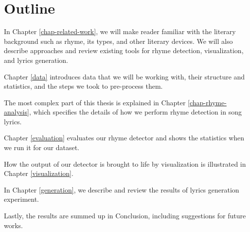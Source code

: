 \section*{Outline}
In Chapter \ref{chap-related-work}, we will make  reader familiar with the literary background such as rhyme, its types, and other literary devices. We will also describe approaches and review existing tools for rhyme detection, visualization, and lyrics generation. 

Chapter \ref{data} introduces data that we will be working with, their structure and statistics, and the steps we took to pre-process them.

The most complex part of this thesis is explained in Chapter \ref{chap-rhyme-analysis}, which specifies the details of how we perform rhyme detection in song lyrics.

Chapter \ref{evaluation} evaluates our rhyme detector and shows the statistics when we run it for our dataset.

How the output of our detector is brought to life by visualization is illustrated in Chapter \ref{visualization}.

In Chapter \ref{generation}, we describe and review the results of lyrics generation experiment.

Lastly, the results are summed up in Conclusion, including suggestions for future works.
